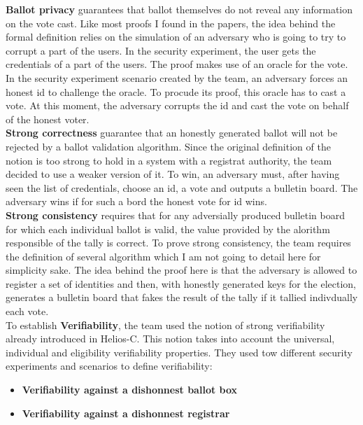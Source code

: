 \documentclass[12pt, a4paper]{report}
\begin{document}
\textbf{Ballot privacy} guarantees that ballot themselves do not reveal any information on the vote cast. Like most proofs I found in the papers, the idea behind the formal definition relies on the simulation of an adversary who is going to try to corrupt a part of the users. In the security experiment, the user gets the credentials of a part of the users. The proof makes use of an oracle for the vote. In the security experiment scenario created by the team, an adversary forces an honest id to challenge the oracle. To procude its proof, this oracle has to cast a vote. At this moment, the adversary corrupts the id and cast the vote on behalf of the honest voter.\\

\textbf{Strong correctness} guarantee that an honestly generated ballot will not be rejected by a ballot validation algorithm. Since the original definition of the notion is too strong to hold in a system with a registrat authority, the team decided to use a weaker version of it. To win, an adversary must, after having seen the list of credentials, choose an id, a vote and outputs a bulletin board. The adversary wins if for such a bord the honest vote for id wins.\\ 

\textbf{Strong consistency} requires that for any adversially produced bulletin board for which each individual ballot is valid, the value provided by the alorithm responsible of the tally is correct.
To prove strong consistency, the team requires the definition of several algorithm which I am not going to detail here for simplicity sake. The idea behind the proof here is that the adversary is allowed to register a set of identities and then, with honestly generated keys for the election, generates a bulletin board that fakes the result of the tally if it tallied indivdually each vote.\\

To establish \textbf{Verifiability}, the team used the notion of strong verifiability already introduced in Helios-C. This notion takes into account the universal, individual and eligibility verifiability properties. They used tow different security experiments and scenarios to define verifiability:

\begin{itemize}
\item \textbf{Verifiability against a dishonnest ballot box}
\item \textbf{Verifiability against a dishonnest registrar}
\end{itemize} 
\end{document}
